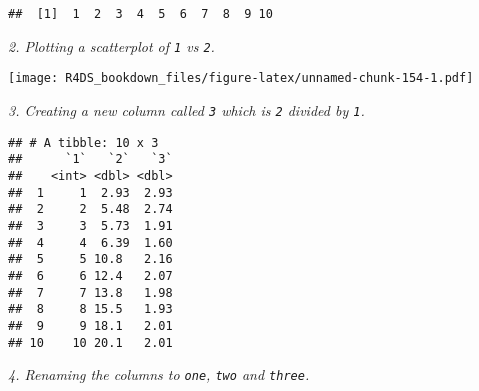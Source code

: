 \documentclass[]{article}
\newenvironment{Shaded}{\begin{snugshade}}{\end{snugshade}}
\newcommand{\KeywordTok}[1]{\textcolor[rgb]{0.13,0.29,0.53}{\textbf{#1}}}
\newcommand{\DataTypeTok}[1]{\textcolor[rgb]{0.13,0.29,0.53}{#1}}
\newcommand{\StringTok}[1]{\textcolor[rgb]{0.31,0.60,0.02}{#1}}
\newcommand{\OperatorTok}[1]{\textcolor[rgb]{0.81,0.36,0.00}{\textbf{#1}}}
\newcommand{\NormalTok}[1]{#1}
\theoremstyle{definition}
\theoremstyle{definition}
\theoremstyle{definition}
\theoremstyle{remark}
\begin{document}
\begin{Shaded}
\end{Shaded}

\begin{verbatim}
##  [1]  1  2  3  4  5  6  7  8  9 10
\end{verbatim}

\emph{2. Plotting a scatterplot of \texttt{1} vs \texttt{2}.}

\begin{Shaded}
\end{Shaded}

\texttt{[image: R4DS\_bookdown\_files/figure-latex/unnamed-chunk-154-1.pdf]}

\emph{3. Creating a new column called \texttt{3} which is \texttt{2}
divided by \texttt{1}.}

\begin{Shaded}
\end{Shaded}

\begin{verbatim}
## # A tibble: 10 x 3
##      `1`   `2`   `3`
##    <int> <dbl> <dbl>
##  1     1  2.93  2.93
##  2     2  5.48  2.74
##  3     3  5.73  1.91
##  4     4  6.39  1.60
##  5     5 10.8   2.16
##  6     6 12.4   2.07
##  7     7 13.8   1.98
##  8     8 15.5   1.93
##  9     9 18.1   2.01
## 10    10 20.1   2.01
\end{verbatim}

\emph{4. Renaming the columns to \texttt{one}, \texttt{two} and
\texttt{three}.}
\end{document}
